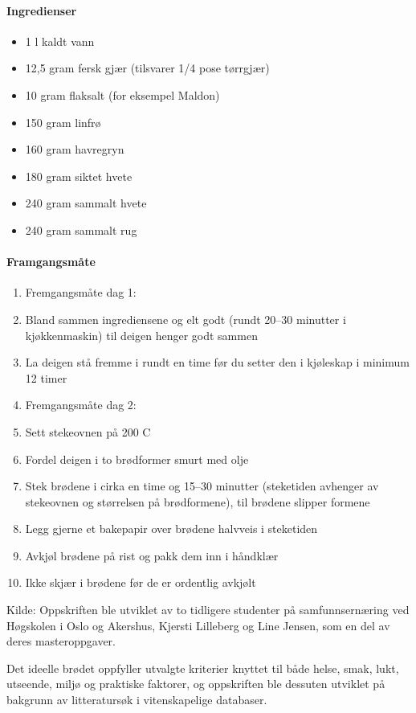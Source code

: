 \documentclass[12pt,a4paper]{book}
\begin{document}
\paragraph{Ingredienser}
\begin{itemize}[noitemsep]
	\item 1 l kaldt vann
	\item 12,5 gram fersk gjær (tilsvarer 1/4 pose tørrgjær)
	\item 10 gram flaksalt (for eksempel Maldon)
	\item 150 gram  linfrø
	\item 160 gram  havregryn
	\item 180 gram  siktet hvete
	\item 240 gram  sammalt hvete
	\item 240 gram  sammalt rug
\end{itemize}

\paragraph{Framgangsmåte}
\begin{enumerate}[noitemsep]
	\item Fremgangsmåte dag 1:
	\item Bland sammen ingrediensene og elt godt (rundt 20--30 minutter i kjøkkenmaskin) til deigen henger godt sammen
	\item La deigen stå fremme i rundt en time før du setter den i kjøleskap i minimum 12 timer
	\item Fremgangsmåte dag 2:
	\item Sett stekeovnen på 200 \degree C
	\item Fordel deigen i to brødformer smurt med olje
	\item Stek brødene i cirka en time og 15--30 minutter (steketiden avhenger av stekeovnen og størrelsen på brødformene), til brødene slipper formene
	\item Legg gjerne et bakepapir over brødene halvveis i steketiden
	\item Avkjøl brødene på rist og pakk dem inn i håndklær
	\item Ikke skjær i brødene før de er ordentlig avkjølt
\end{enumerate}

Kilde: Oppskriften ble utviklet av to tidligere studenter på samfunnsernæring ved Høgskolen i Oslo og Akershus, Kjersti Lilleberg og Line Jensen, som en del av deres masteroppgaver.

Det ideelle brødet oppfyller utvalgte kriterier knyttet til både helse, smak, lukt, utseende, miljø og praktiske faktorer, og oppskriften ble dessuten utviklet på bakgrunn av litteratursøk i vitenskapelige databaser.
\end{document}
